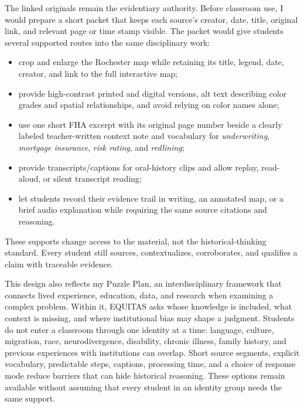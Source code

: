 \documentclass[11pt]{article}
\newcommand{\subsectiontitle}[1]{\par\Needspace{4\baselineskip}\addvspace{0.08in}\noindent{\large\bfseries\color{DeepNavy}#1}\par}
\begin{document}
\subsectiontitle{Accessibility and source preparation}
The linked originals remain the evidentiary authority. Before classroom use, I would prepare a short packet that keeps each source's creator, date, title, original link, and relevant page or time stamp visible. The packet would give students several supported routes into the same disciplinary work:
\begin{itemize}
  \item crop and enlarge the Rochester map while retaining its title, legend, date, creator, and link to the full interactive map;
  \item provide high-contrast printed and digital versions, alt text describing color grades and spatial relationships, and avoid relying on color names alone;
  \item use one short FHA excerpt with its original page number beside a clearly labeled teacher-written context note and vocabulary for \emph{underwriting}, \emph{mortgage insurance}, \emph{risk rating}, and \emph{redlining};
  \item provide transcripts/captions for oral-history clips and allow replay, read-aloud, or silent transcript reading;
  \item let students record their evidence trail in writing, an annotated map, or a brief audio explanation while requiring the same source citations and reasoning.
\end{itemize}
These supports change access to the material, not the historical-thinking standard. Every student still sources, contextualizes, corroborates, and qualifies a claim with traceable evidence.

This design also reflects my Puzzle Plan, an interdisciplinary framework that connects lived experience, education, data, and research when examining a complex problem. Within it, EQUITAS asks whose knowledge is included, what context is missing, and where institutional bias may shape a judgment. Students do not enter a classroom through one identity at a time: language, culture, migration, race, neurodivergence, disability, chronic illness, family history, and previous experiences with institutions can overlap. Short source segments, explicit vocabulary, predictable steps, captions, processing time, and a choice of response mode reduce barriers that can hide historical reasoning. These options remain available without assuming that every student in an identity group needs the same support.
\end{document}
